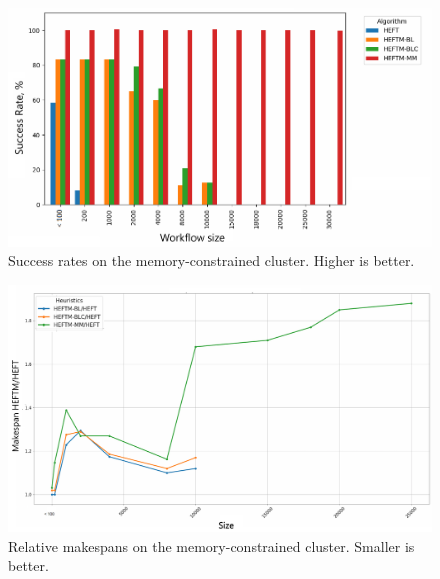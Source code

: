 \documentclass[conference]{IEEEtran}
\begin{document}
\begin{figure}[tb]
    \centering
    \includegraphics[width=1\columnwidth] {images/success-rates-tiny}
    \caption{Success rates on the memory-constrained cluster. Higher is better. }
    \label{fig:success-rates-tiny}
    \vspace{-0.15cm}
\end{figure}


\begin{figure}[tb]
    \centering
    \includegraphics[width=1\columnwidth] {images/makespan_relations_by_wf_size-constrained2}
    \caption{Relative makespans on the memory-constrained cluster.
    Smaller is better.}
    \label{fig:ms-relations-by-workflow-constrained}
    \vspace{-0.15cm}
\end{figure}
\end{document}
